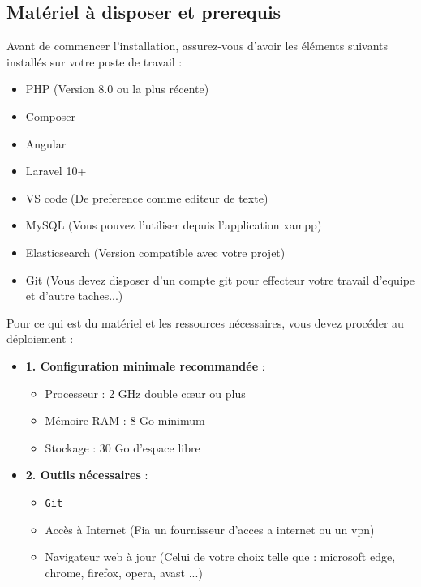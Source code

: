\documentclass[12pt]{article}
\begin{document}
            \subsection{Matériel à disposer et prerequis}
            Avant de commencer l'installation, assurez-vous d'avoir les éléments suivants installés sur votre
            poste de travail : 
                \begin{itemize}[label=--]
                    \item PHP (Version 8.0 ou la plus récente)
                    \item Composer
                    \item Angular
                    \item Laravel 10+
                    \item VS code (De preference comme editeur de texte)
                    \item MySQL (Vous pouvez l'utiliser depuis l'application xampp)
                    \item Elasticsearch (Version compatible avec votre projet)
                    \item Git (Vous devez disposer d'un compte git pour effecteur votre travail d'equipe et d'autre taches...)
                \end{itemize}
            Pour ce qui est du matériel et les ressources nécessaires, vous devez procéder au déploiement :
            \begin{itemize}[label=--]
                \item \textbf{1. Configuration minimale recommandée} : 
                    \begin{itemize}
                        \item Processeur : 2 GHz double cœur ou plus
                        \item Mémoire RAM : 8 Go minimum
                        \item Stockage : 30 Go d’espace libre
                    \end{itemize}
                \item \textbf{2. Outils nécessaires} : 
                    \begin{itemize}
                        \item \texttt{Git}
                        \item Accès à Internet (Fia un fournisseur d'acces a internet ou un vpn)
                        \item Navigateur web à jour (Celui de votre choix telle que : microsoft edge, chrome, firefox, opera, avast ...)
                    \end{itemize}
            \end{itemize}
\end{document}
